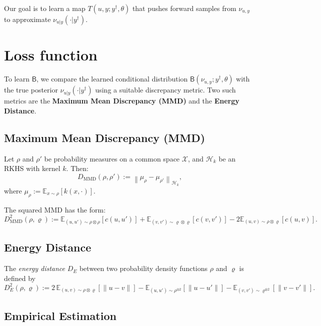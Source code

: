 \documentclass[twoside,11pt]{article}
\begin{document}
Our goal is to learn a map \(T(u, y; y^\dag, \theta)\) that pushes forward samples from \(\nu_{u,y}\) to approximate \(\nu_{u|y}(\cdot | y^\dag)\).

\newpage





\section*{Loss function}
To learn \(\mathsf{B}\), we compare the learned conditional distribution \(\mathsf{B}(\nu_{u,y}; y^\dag, \theta)\) with the true posterior \(\nu_{u|y}(\cdot | y^\dag)\) using a suitable discrepancy metric. Two such metrics are the \textbf{Maximum Mean Discrepancy (MMD)} and the \textbf{Energy Distance}.



\subsection*{Maximum Mean Discrepancy (MMD)}

Let \(\rho\) and \(\rho'\) be probability measures on a common space \(\mathcal{X}\), and \(\mathcal{H}_k\) be an RKHS with kernel \(k\). Then:
\[
D_{\mathrm{MMD}}(\rho, \rho') := \left\| \mu_{\rho} - \mu_{\rho'} \right\|_{\mathcal{H}_k},
\]
where \(\mu_\rho := \mathbb{E}_{x \sim \rho} [k(x, \cdot)]\).

The squared MMD has the form:
\begin{equation}
    D^2_{\mathrm{MMD}}(\rho, \varrho) := \mathbb{E}_{(u,u') \sim \rho \otimes \rho} \left[ c(u, u') \right]
    + \mathbb{E}_{(v,v') \sim \varrho \otimes \varrho} \left[ c(v, v') \right]
    - 2\mathbb{E}_{(u,v) \sim \rho \otimes \varrho} \left[ c(u, v) \right] .
\end{equation}


\subsection*{Energy Distance}
The \textit{energy distance} $D_E$ between two probability density functions $\rho$ and $\varrho$ is defined by
\[
D^2_E(\rho, \varrho) := 2\, \mathbb{E}_{(u,v) \sim \rho \otimes \varrho}[\|u - v\|] - \mathbb{E}_{(u,u') \sim \rho^{\otimes 2}}[\|u - u'\|] - \mathbb{E}_{(v,v') \sim \varrho^{\otimes 2}}[\|v - v'\|].
\]






\subsection*{Empirical Estimation}
\end{document}
